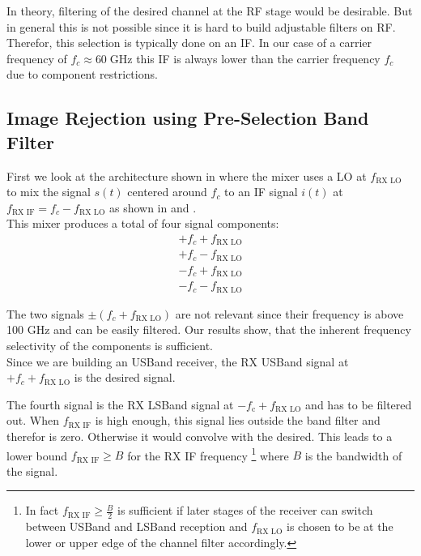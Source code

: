 In theory, filtering of the desired channel at the \gls{RF} stage would be desirable.
But in general this is not possible since it is hard to build adjustable filters
on \gls{RF}. Therefor, this selection is typically done on an \acrfull{IF}.
In our case of a carrier frequency of $f_c \approx 60 \;\text{GHz}$ this \gls{IF}
is always lower than the carrier frequency $f_c$ due to component restrictions. \\

\subsection{Image Rejection using Pre-Selection Band Filter}
\label{sec:rx_rf_0}
First we look at the architecture shown in  where
the mixer uses a \gls{LO} at $f_{\text{RX LO}}$ to mix the signal $s(t)$
centered around $f_{c}$ to an \gls{IF} signal $i(t)$ at
$f_{\text{RX IF}} = f_{c} - f_{\text{RX LO}}$ as shown in 
and . \\

This mixer produces a total of four signal components:
\begin{align}
  + f_{c} + f_{\text{RX LO}} \\
  + f_{c} - f_{\text{RX LO}} \\
  - f_{c} + f_{\text{RX LO}} \\
  - f_{c} - f_{\text{RX LO}}
\end{align}

The two signals $\pm (f_{c} + f_{\text{RX LO}})$ are not relevant since their
frequency is above 100 GHz and can be easily filtered. Our results show, that
the inherent frequency selectivity of the components is sufficient. \\

Since we are building an \gls{USBand} receiver, the \gls{RX} \gls{USBand} signal
at $+ f_{c} + f_{\text{RX LO}}$ is the desired signal.

The fourth signal is the \gls{RX} \gls{LSBand} signal at
$-f_{\text{c}} + f_{\text{RX LO}}$ and has to be filtered out. 
When $f_{\text{RX IF}}$ is high enough, this signal lies outside the band filter
and therefor is zero. Otherwise it would convolve with the desired.
This leads to a lower bound $f_{\text{RX IF}} \geq B$ for the \gls{RX} \gls{IF}
frequency
\footnote{%
  In fact $f_{\text{RX IF}} \geq \frac{B}{2}$
  is sufficient if later stages of the receiver can switch
  between \gls{USBand} and \gls{LSBand} reception and
  $f_{\text{RX LO}}$ is chosen to be at the lower or upper edge of the
  channel filter accordingly.}
where $B$ is the bandwidth of the signal. \\

